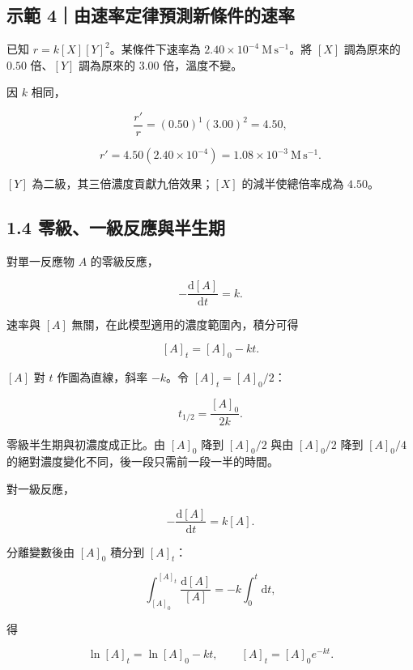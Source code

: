 \documentclass[11pt,a4paper]{article}
\begin{document}
\begin{HandoutWorkedExample}

\subsection{示範 4｜由速率定律預測新條件的速率}\label{ux793aux7bc4-4ux7531ux901fux7387ux5b9aux5f8bux9810ux6e2cux65b0ux689dux4ef6ux7684ux901fux7387}

已知 \(r=k[X][Y]^2\)。某條件下速率為 \(2.40\times10^{-4}\ \mathrm{M\,s^{-1}}\)。將 \([X]\) 調為原來的 \(0.50\) 倍、\([Y]\) 調為原來的 \(3.00\) 倍，溫度不變。

因 \(k\) 相同，

\[
\frac{r'}{r}=(0.50)^1(3.00)^2=4.50,
\]

\[
r'=4.50(2.40\times10^{-4})
=1.08\times10^{-3}\ \mathrm{M\,s^{-1}}.
\]

\([Y]\) 為二級，其三倍濃度貢獻九倍效果；\([X]\) 的減半使總倍率成為 \(4.50\)。

\end{HandoutWorkedExample}

\subsection{1.4 零級、一級反應與半生期}\label{ux96f6ux7d1aux4e00ux7d1aux53cdux61c9ux8207ux534aux751fux671f}

對單一反應物 \(A\) 的零級反應，

\[
-\frac{\mathrm d[A]}{\mathrm dt}=k.
\]

速率與 \([A]\) 無關，在此模型適用的濃度範圍內，積分可得

\[
[A]_t=[A]_0-kt.
\]

\([A]\) 對 \(t\) 作圖為直線，斜率 \(-k\)。令 \([A]_t=[A]_0/2\)：

\[
t_{1/2}=\frac{[A]_0}{2k}.
\]

零級半生期與初濃度成正比。由 \([A]_0\) 降到 \([A]_0/2\) 與由 \([A]_0/2\) 降到 \([A]_0/4\) 的絕對濃度變化不同，後一段只需前一段一半的時間。

對一級反應，

\[
-\frac{\mathrm d[A]}{\mathrm dt}=k[A].
\]

分離變數後由 \([A]_0\) 積分到 \([A]_t\)：

\[
\int_{[A]_0}^{[A]_t}\frac{\mathrm d[A]}{[A]}
=-k\int_0^t\mathrm dt,
\]

得

\[
\ln[A]_t=\ln[A]_0-kt,
\qquad
[A]_t=[A]_0e^{-kt}.
\]
\end{document}
